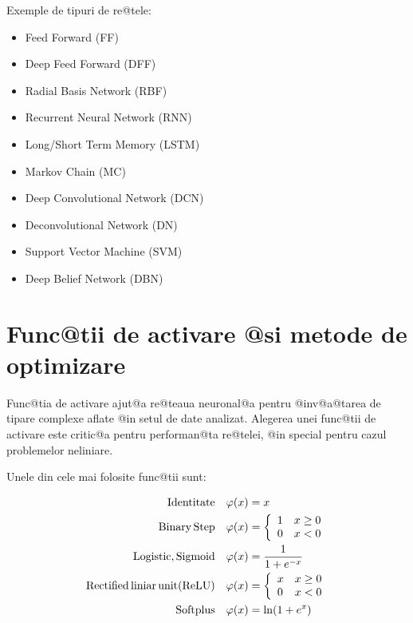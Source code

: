 Exemple de tipuri de re@tele:

\begin{itemize}
	\item Feed Forward (FF)
	\item Deep Feed Forward (DFF)
	\item Radial Basis Network (RBF)
	\item Recurrent Neural Network (RNN)
	\item Long/Short Term Memory (LSTM)
	\item Markov Chain (MC)
	\item Deep Convolutional Network (DCN)
	\item Deconvolutional Network (DN)
	\item Support Vector Machine (SVM)
	\item Deep Belief Network (DBN)
\end{itemize}



\section{Func@tii de activare @si metode de optimizare}
Func@tia de activare ajut@a re@teaua neuronal@a pentru @inv@a@tarea de tipare complexe aflate @in setul de date analizat. Alegerea unei func@tii de activare este critic@a pentru performan@ta re@telei, @in special pentru cazul problemelor neliniare.

Unele din cele mai folosite func@tii sunt:

\begin{align}
	{\rm Identitate} \quad \varphi (x) &= x \\
	{\rm Binary \, Step} \quad \varphi (x) &= \left\lbrace
		\begin{array}{lc}
			1 & x \geq 0 \\
			0 & x < 0
		\end{array}
	\right. \\
	{\rm Logistic, Sigmoid} \quad \varphi (x) &= \displaystyle\frac{1}{1 + e^{-x}} \\
	{\rm Rectified\, liniar\, unit (ReLU)} \quad \varphi (x) &= \left\lbrace
		\begin{array}{lc}
			x & x \geq 0 \\
			0 & x < 0
		\end{array}
	\right. \label{eq:relu} \\
	{\rm Softplus} \quad \varphi (x) &= \ln ( 1 + e^x) 
\end{align}

